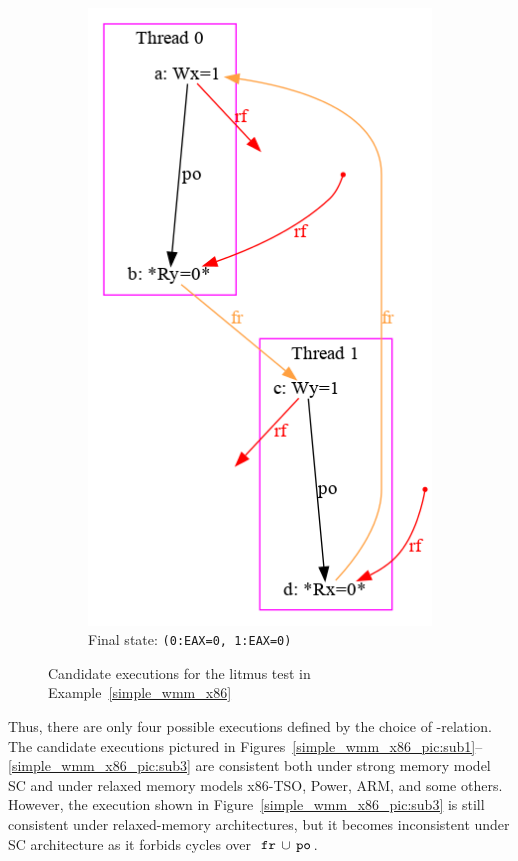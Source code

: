 \begin{figure}[!htb]
\begin{subfigure}[t]{.23\textwidth}
  \includegraphics[width=.9\linewidth]{img/my/sb-example/SB-dot-4.png}
  \caption{Final state: \texttt{(0:EAX=0,~1:EAX=0)}}
  \label{simple_wmm_x86_pic:sub4}
\end{subfigure}
\hfill
\caption{Candidate executions for the litmus test in Example~\ref{simple_wmm_x86}}
\label{simple_wmm_x86_pic}
\end{figure}

Thus, there are only four possible executions defined by the choice of \rf-relation.
The candidate executions pictured in Figures~\ref{simple_wmm_x86_pic:sub1}--\ref{simple_wmm_x86_pic:sub3} are consistent both under strong memory model SC and under relaxed memory models x86-TSO, Power, ARM, and some others.
However, the execution shown in Figure~\ref{simple_wmm_x86_pic:sub3} is still consistent under relaxed-memory architectures, but it becomes inconsistent under SC architecture as it forbids cycles over~$\,\texttt{fr}\,\cup\,\texttt{po}\,$.


